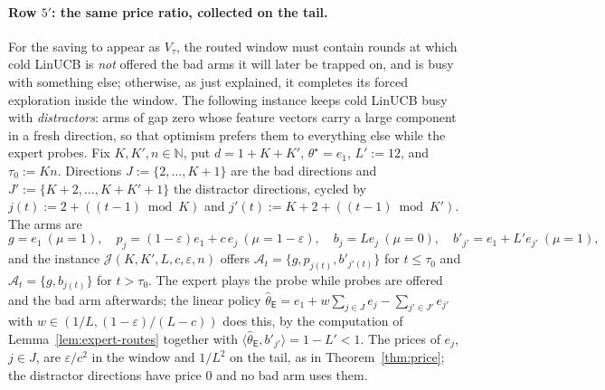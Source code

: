 \documentclass{article}
\theoremstyle{definition}
\theoremstyle{remark}
\newcommand{\N}{\mathbb{N}}
\newcommand{\eps}{\varepsilon}
\theoremstyle{remark}
\newcommand{\Exp}{\mathsf{E}}
\begin{document}
\paragraph{Row $5'$: the same price ratio, collected on the tail.}
For the saving to appear as $V_\tau$, the routed window must contain rounds
at which cold LinUCB is \emph{not} offered the bad arms it will later be
trapped on, and is busy with something else; otherwise, as just explained, it
completes its forced exploration inside the window. The following instance
keeps cold LinUCB busy with \emph{distractors}: arms of gap zero whose
feature vectors carry a large component in a fresh direction, so that
optimism prefers them to everything else while the expert probes. Fix
$K,K',n\in\N$, put $d=1+K+K'$, $\theta^\star=e_1$, $L':=12$, and
$\tau_0:=Kn$. Directions $J:=\{2,\dots,K+1\}$ are the bad directions and
$J':=\{K+2,\dots,K+K'+1\}$ the distractor directions, cycled by
$j(t):=2+((t-1)\bmod K)$ and $j'(t):=K+2+((t-1)\bmod K')$. The arms are
\[
g=e_1\ (\mu=1),\quad p_j=(1-\eps)e_1+c\,e_j\ (\mu=1-\eps),\quad
b_j=Le_j\ (\mu=0),\quad b'_{j'}=e_1+L'e_{j'}\ (\mu=1),
\]
and the instance $\mathcal J(K,K',L,c,\eps,n)$ offers
$\mathcal A_t=\{g,p_{j(t)},b'_{j'(t)}\}$ for $t\le\tau_0$ and
$\mathcal A_t=\{g,b_{j(t)}\}$ for $t>\tau_0$. The expert plays the probe while
probes are offered and the bad arm afterwards; the linear policy
$\widehat\theta_{\Exp}=e_1+w\sum_{j\in J}e_j-\sum_{j'\in J'}e_{j'}$ with
$w\in(1/L,(1-\eps)/(L-c))$ does this, by the computation of
Lemma~\ref{lem:expert-routes} together with $\langle\widehat\theta_{\Exp},b'_{j'}\rangle=1-L'<1$.
The prices of $e_j$, $j\in J$, are $\eps/c^2$ in the window and $1/L^2$ on
the tail, as in Theorem~\ref{thm:price}; the distractor directions have
price $0$ and no bad arm uses them.
\end{document}
